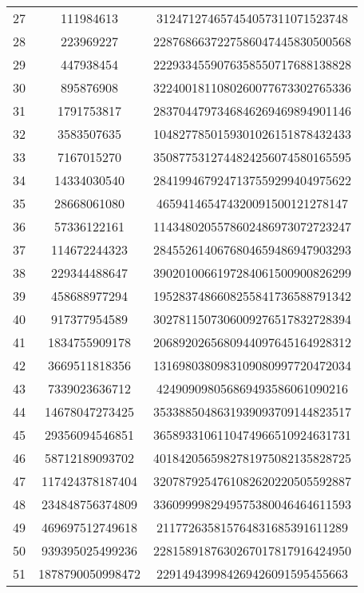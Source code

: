 \documentclass[fleqn]{article}
\begin{document}
\begin{center}
\begin{tabular}{c | c | c}
            27 & 111984613 & 312471274657454057311071523748 \\
            28 & 223969227 & 2287686637227586047445830500568 \\
            29 & 447938454 & 2229334559076358550717688138828 \\
            30 & 895876908 & 3224001811080260077673302765336 \\
            31 & 1791753817 & 2837044797346846269469894901146 \\
            32 & 3583507635 & 1048277850159301026151878432433 \\
            33 & 7167015270 & 3508775312744824256074580165595 \\
            34 & 14334030540 & 2841994679247137559299404975622 \\
            35 & 28668061080 & 465941465474320091500121278147 \\
            36 & 57336122161 & 1143480205578602486973072723247 \\
            37 & 114672244323 & 2845526140676804659486947903293 \\
            38 & 229344488647 & 3902010066197284061500900826299 \\
            39 & 458688977294 & 1952837486608255841736588791342 \\
            40 & 917377954589 & 3027811507306009276517832728394 \\
            41 & 1834755909178 & 2068920265680944097645164928312 \\
            42 & 3669511818356 & 1316980380983109080997720472034 \\
            43 & 7339023636712 & 424909098056869493586061090216 \\
            44 & 14678047273425 & 3533885048631939093709144823517 \\
            45 & 29356094546851 & 3658933106110474966510924631731 \\
            46 & 58712189093702 & 4018420565982781975082135828725 \\
            47 & 117424378187404 & 3207879254761082620220505592887 \\
            48 & 234848756374809 & 3360999982949575380046464611593 \\
            49 & 469697512749618 & 211772635815764831685391611289 \\
            50 & 939395025499236 & 2281589187630267017817916424950 \\
            51 & 1878790050998472 & 229149439984269426091595455663 \\

\end{tabular}
\end{center}
\end{document}
